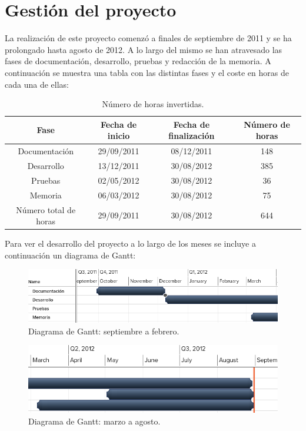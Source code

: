 \chapter{Gestión del proyecto}
\label{anx:gestion}



La realización de este proyecto comenzó a finales de septiembre de 2011 y se ha prolongado hasta agosto de 2012. A lo largo del mismo se han atravesado las fases de documentación, desarrollo, pruebas y redacción de la memoria. A continuación se muestra una tabla con las distintas fases y el coste en horas de cada una de ellas:

\begin{table}[!htbp]
\centering
   \begin{tabular}{|c|c|c|c|}
      \hline
      \textbf{Fase} & \textbf{Fecha de inicio} & \textbf{Fecha de finalización} & \textbf{Número de horas} \\ \hline
      Documentación & 29/09/2011 & 08/12/2011 & 148 \\ \hline
      Desarrollo & 13/12/2011 & 30/08/2012 & 385 \\ \hline
      Pruebas & 02/05/2012 & 30/08/2012 & 36 \\ \hline
      Memoria & 06/03/2012 & 30/08/2012 & 75 \\ \hline
      \hline
      Número total de horas & 29/09/2011 & 30/08/2012 & 644 \\ \hline
   \end{tabular}
\caption{Número de horas invertidas.}
\label{table:horas}
\end{table}

Para ver el desarrollo del proyecto a lo largo de los meses se incluye a continuación un diagrama de Gantt:

\begin{figure} [!htbp]
  \centering
  \includegraphics[width=13.5cm]{imagenes/gantt1.png}
  \caption{Diagrama de Gantt: septiembre a febrero.}
\label{figure:gantt1}
\end{figure}

\begin{figure} [!htbp]
  \centering
  \includegraphics[width=13.5cm]{imagenes/gantt2.png}
  \caption{Diagrama de Gantt: marzo a agosto.}
\label{figure:gantt2}
\end{figure}

